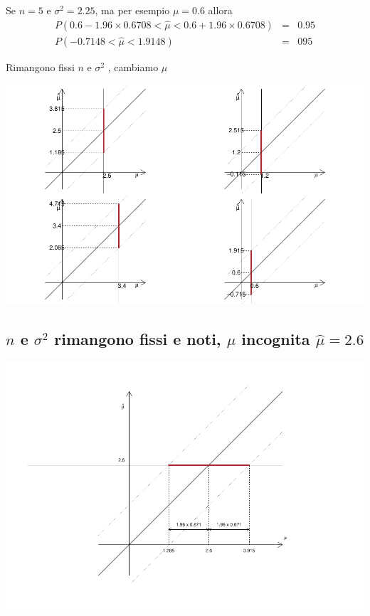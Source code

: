 \documentclass[
  11pt,
]{book}
\theoremstyle{mytheoremstyle}
\theoremstyle{mydefstyle}
\begin{document}
Se \(n=5\) e \(\sigma^2=2.25\), ma per esempio \(\mu= 0.6\) allora
\begin{eqnarray*}
  P\left(0.6-1.96\times0.6708<\hat \mu < 0.6+1.96\times0.6708\right) &=& 0.95 \\
  P(-0.7148 < \hat \mu < 1.9148) &=& 095 
\end{eqnarray*}

Rimangono fissi \(n\) e \(\sigma^2\) , cambiamo \(\mu\)

\begin{center}\includegraphics{Appunti_di_Statistica_2025_files/figure-latex/13-stima-intervallare-9-1} \end{center}

\subsection{\texorpdfstring{\(n\) e \(\sigma^2\) rimangono fissi e noti, \(\mu\) incognita \(\hat \mu=2.6\)}{n e \textbackslash sigma\^{}2 rimangono fissi e noti, \textbackslash mu incognita \textbackslash hat \textbackslash mu=2.6}}\label{n-e-sigma2-rimangono-fissi-e-noti-mu-incognita-hat-mu2.6}

\begin{center}\includegraphics{Appunti_di_Statistica_2025_files/figure-latex/13-stima-intervallare-10-1} \end{center}
\end{document}

